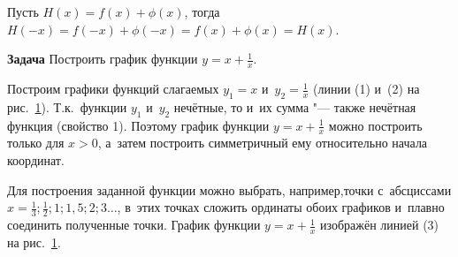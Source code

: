 Пусть $H(x) = f(x) + \phi(x)$, тогда
$H(-x) = f(-x) + \phi(-x) = f(x) + \phi(x) = H(x)$.

\textbf{Задача}
Построить график функции $\displaystyle y = x + \frac{1}{x}$. \\

\begin{figure}\label{fig_1_8_1}
\end{figure}

Построим графики функций слагаемых $y_{1} = x$ и~$\displaystyle y_{2} = \frac{1}{x}$
(линии (1) и~(2) на рис.\ \ref{fig_1_8_1}). Т.к.\ функции $y_{1}$ и~$y_{2}$ нечётные,
то и~их сумма "--- также нечётная функция (свойство 1).
Поэтому график функции $\displaystyle y = x + \frac{1}{x}$ можно
построить только для $x > 0$, а~затем построить симметричный ему
относительно начала координат.

Для построения заданной функции можно выбрать, например,точки с~абсциссами
$\displaystyle x = \frac{1}{3}; \frac{1}{2}; 1; 1{,}5; 2; 3 \dots$,
в~этих точках сложить ординаты обоих графиков и~плавно соединить
полученные точки. График функции $\displaystyle y = x + \frac{1}{x}$
изображён линией (3) на рис.\ \ref{fig_1_8_1}.

